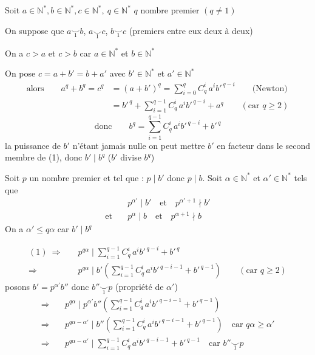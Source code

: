  Soit $a\in\mathbb N^*,b\in\mathbb N^*,c\in\mathbb N^*,\ q\in\mathbb N^*$ \quad $q$ nombre premier $(q\ne1)$

On suppose que $a\mathrel{\underset{1}{\smile}}b$, $a\mathrel{\underset{1}{\smile}}c$, $b\mathrel{\underset{1}{\smile}}c$ (premiers entre eux deux à deux)

On a $c>a$ et $c>b$ car $a\in\mathbb N^*$ et $b\in\mathbb N^*$

On pose $c=a+b'=b+a'$ avec $b'\in\mathbb N^*$ et $a'\in\mathbb N^*$
\[
\begin{aligned}
\text{alors}\qquad a^q+b^q=c^q&=(a+b')^q=\sum_{i=0}^{q}C_q^i\,a^i b'^{\,q-i}\qquad\text{(Newton)}\\
 &=b'^{\,q}+\sum_{i=1}^{q-1}C_q^i\,a^i b'^{\,q-i}+a^q\qquad(\text{car }q\geqslant2)
\end{aligned}
\]
\[
\text{donc}\qquad b^q=\sum_{i=1}^{q-1}C_q^i\,a^i b'^{\,q-i}+b'^{\,q}\tag*{(1)}
\]
la puissance de $b'$ n'étant jamais nulle on peut mettre $b'$ en facteur dans le second membre de (1), donc $b'\mid b^q$ ($b'$ divise $b^q$)

Soit $p$ un nombre premier  et tel que : $p\mid b'$ donc $p\mid b$. Soit $\alpha\in\mathbb N^*$ et $\alpha'\in\mathbb N^*$ tels que
\[
\begin{aligned}
 &p^{\alpha'}\mid b'\quad\text{et}\quad p^{\alpha'+1}\nmid b'\\
 \text{et}\quad &p^\alpha\mid b\quad\text{et}\quad p^{\alpha+1}\nmid b
\end{aligned}
\]
On a $\alpha'\leqslant q\alpha$ car $b'\mid b^q$

\[
\begin{aligned}
(1)\ \Longrightarrow\quad&p^{q\alpha}\mid\sum_{i=1}^{q-1}C_q^i\,a^i b'^{\,q-i}+b'^{\,q}\\
\Longrightarrow\quad&p^{q\alpha}\mid b'\left(\sum_{i=1}^{q-1}C_q^i\,a^i b'^{\,q-i-1}+b'^{\,q-1}\right)\qquad(\text{car }q\geqslant2)
\end{aligned}
\]
posons $b'=p^{\alpha'}b''$ donc $b''\mathrel{\underset{1}{\smile}}p$ (propriété de $\alpha'$)
\[
\begin{aligned}
\Longrightarrow\quad&p^{q\alpha}\mid p^{\alpha'}b''\left(\sum_{i=1}^{q-1}C_q^i\,a^i b'^{\,q-i-1}+b'^{\,q-1}\right)\\
\Longrightarrow\quad&p^{q\alpha-\alpha'}\mid b''\left(\sum_{i=1}^{q-1}C_q^i\,a^i b'^{\,q-i-1}+b'^{\,q-1}\right)\quad\text{car }q\alpha\geqslant\alpha'\\
\Longrightarrow\quad&p^{q\alpha-\alpha'}\mid\sum_{i=1}^{q-1}C_q^i\,a^i b'^{\,q-i-1}+b'^{\,q-1}\quad\text{car }b''\mathrel{\underset{1}{\smile}}p
\end{aligned}
\]

